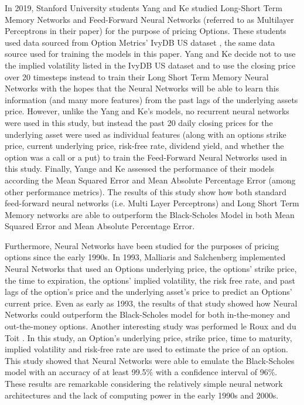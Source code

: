 \documentclass[a4paper]{article}
\begin{document}
In 2019, Stanford University students Yang and Ke \cite{ke2019option} studied Long-Short Term Memory Networks and Feed-Forward Neural Networks (referred to as Multilayer Perceptrons in their paper) for the purpose of pricing Options. These students used data sourced from Option Metrics' IvyDB US dataset \cite{optionmetrics}, the same data source used for training the models in this paper. Yang and Ke decide not to use the implied volatility listed in the IvyDB US dataset and to use the closing price over 20 timesteps instead to train their Long Short Term Memory Neural Networks with the hopes that the Neural Networks will be able to learn this information (and many more features) from the past lags of the underlying assets price. However, unlike the Yang and Ke's models, no recurrent neural networks were used in this study, but instead the past 20 daily closing prices for the underlying asset were used as individual features (along with an options strike price, current underlying price, risk-free rate, dividend yield, and whether the option was a call or a put) to train the Feed-Forward Neural Networks used in this study. Finally, Yange and Ke assessed the performance of their models according the Mean Squared Error and Mean Absolute Percentage Error (among other performance metrics). The results of this study show how both standard feed-forward neural networks (i.e. Multi Layer Perceptrons) and Long Short Term Memory networks are able to outperform the Black-Scholes Model in both Mean Squared Error and Mean Absolute Percentage Error.

Furthermore, Neural Networks have been studied for the purposes of pricing options since the early 1990s. In 1993, Malliaris and Salchenberg \cite{malliaris1993beating} implemented Neural Networks that used an Options underlying price, the options' strike price, the time to expiration, the options' implied volatility, the risk free rate, and past lags of the option's price and the underlying asset's price to predict an Options' current price. Even as early as 1993, the results of that study showed how Neural Networks could outperform the Black-Scholes model for both in-the-money and out-the-money options. Another interesting study was performed le Roux and du Toit \cite{leRoux2001}. In this study, an Option's underlying price, strike price, time to maturity, implied volatility and risk-free rate are used to estimate the price of an option. This study showed that Neural Networks were able to emulate the Black-Scholes model with an accuracy of at least 99.5\% with a confidence interval of 96\%. These results are remarkable considering the relatively simple neural network architectures and the lack of computing power in the early 1990s and 2000s.
\end{document}
